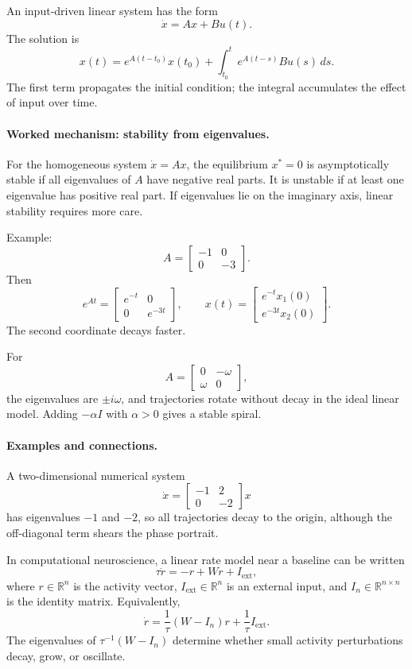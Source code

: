 An input-driven linear system has the form
\[
\dot x=Ax+Bu(t).
\]
The solution is
\[
x(t)=e^{A(t-t_0)}x(t_0)+
\int_{t_0}^t e^{A(t-s)}B u(s)\,ds.
\]
The first term propagates the initial condition; the integral accumulates the effect of input over time.

\paragraph{Worked mechanism: stability from eigenvalues.}
For the homogeneous system \(\dot x=Ax\), the equilibrium \(x^*=0\) is asymptotically stable if all eigenvalues of \(A\) have negative real parts. It is unstable if at least one eigenvalue has positive real part. If eigenvalues lie on the imaginary axis, linear stability requires more care.

Example:
\[
A=\begin{bmatrix}-1&0\\0&-3\end{bmatrix}.
\]
Then
\[
e^{At}=\begin{bmatrix}e^{-t}&0\\0&e^{-3t}\end{bmatrix},
\qquad
x(t)=\begin{bmatrix}e^{-t}x_1(0)\\e^{-3t}x_2(0)\end{bmatrix}.
\]
The second coordinate decays faster.

For
\[
A=\begin{bmatrix}0&-\omega\\ \omega&0\end{bmatrix},
\]
the eigenvalues are \(\pm i\omega\), and trajectories rotate without decay in the ideal linear model. Adding \(-\alpha I\) with \(\alpha>0\) gives a stable spiral.

\paragraph{Examples and connections.}
A two-dimensional numerical system
\[
\dot x=
\begin{bmatrix}-1&2\\0&-2\end{bmatrix}x
\]
has eigenvalues \(-1\) and \(-2\), so all trajectories decay to the origin, although the off-diagonal term shears the phase portrait.

In computational neuroscience, a linear rate model near a baseline can be written
\[
\tau \dot r=-r+Wr+I_{\mathrm{ext}},
\]
where \(r\in\mathbb{R}^n\) is the activity vector,
\(I_{\mathrm{ext}}\in\mathbb{R}^n\) is an external input, and
\(I_n\in\mathbb{R}^{n\times n}\) is the identity matrix. Equivalently,
\[
\dot r=\frac{1}{\tau}(W-I_n)r+\frac{1}{\tau}I_{\mathrm{ext}}.
\]
The eigenvalues of \(\tau^{-1}(W-I_n)\) determine whether small activity perturbations decay, grow, or oscillate.

